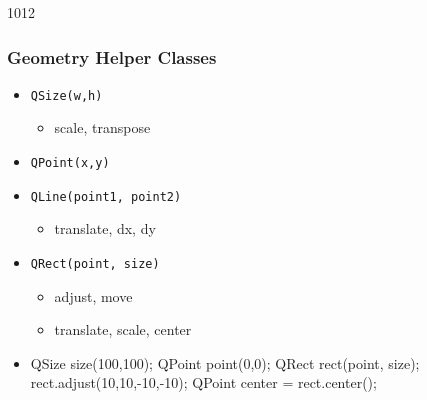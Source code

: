 \begin{slide}[fragile]{1012}\frametitle{Geometry Helper Classes}
\begin{itemize}
\item \texttt{QSize(w,h)}
  \begin{itemize}
  \item scale, transpose
  \end{itemize}
\item \texttt{QPoint(x,y)}
\item \texttt{QLine(point1, point2)}
  \begin{itemize}
  \item translate, dx, dy
  \end{itemize}
\item \texttt{QRect(point, size)}
  \begin{itemize}
  \item adjust, move
  \item translate, scale, center
  \end{itemize}
\item[] \begin{cpp}
QSize size(100,100);
QPoint point(0,0);
QRect rect(point, size);
rect.adjust(10,10,-10,-10);
QPoint center = rect.center();    
  \end{cpp}

\end{itemize}
\end{slide}                             
